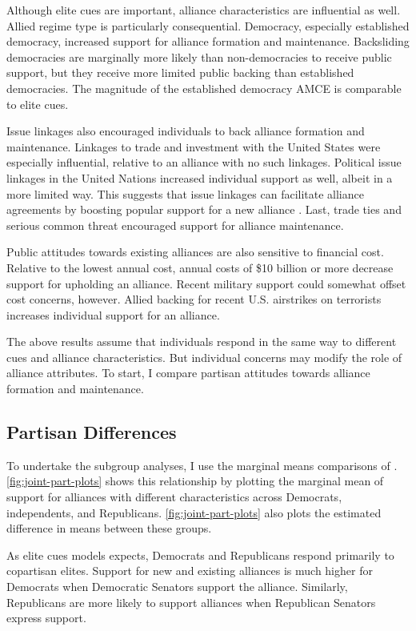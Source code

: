 \documentclass[12pt]{article}
\begin{document}
Although elite cues are important, alliance characteristics are influential as well. 
Allied regime type is particularly consequential. 
Democracy, especially established democracy, increased support for alliance formation and maintenance.  
Backsliding democracies are marginally more likely than non-democracies to receive public support, but they receive more limited public backing than established democracies.
The magnitude of the established democracy AMCE is comparable to elite cues. 


Issue linkages also encouraged individuals to back alliance formation and maintenance. 
Linkages to trade and investment with the United States were especially influential, relative to an alliance with no such linkages. 
Political issue linkages in the United Nations increased individual support as well, albeit in a more limited way. 
This suggests that issue linkages can facilitate alliance agreements by boosting popular support for a new alliance \citep{Poast2012}. 
Last, trade ties and serious common threat encouraged support for alliance maintenance. 
 

Public attitudes towards existing alliances are also sensitive to financial cost.
Relative to the lowest annual cost, annual costs of \$10 billion or more decrease support for upholding an alliance.  
Recent military support could somewhat offset cost concerns, however. 
Allied backing for recent U.S. airstrikes on terrorists increases individual support for an alliance. 


The above results assume that individuals respond in the same way to different cues and alliance characteristics. 
But individual concerns may modify the role of alliance attributes.
To start, I compare partisan attitudes towards alliance formation and maintenance. 



\subsection{Partisan Differences}


To undertake the subgroup analyses, I use the marginal means comparisons of \citet{Leeperetal2020}. 
\autoref{fig:joint-part-plots} shows this relationship by plotting the marginal mean of support for alliances with different characteristics across Democrats, independents, and Republicans. 
\autoref{fig:joint-part-plots} also plots the estimated difference in means between these groups. 


As elite cues models expects, Democrats and Republicans respond primarily to copartisan elites.
Support for new and existing alliances is much higher for Democrats when Democratic Senators support the alliance.
Similarly, Republicans are more likely to support alliances when Republican Senators express support.
\end{document}
